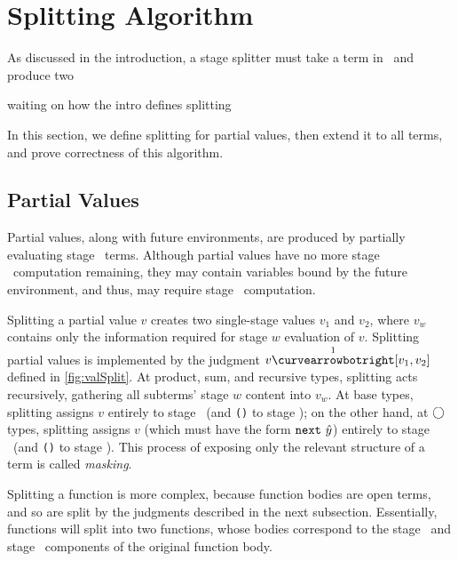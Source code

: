 
\section{Splitting Algorithm}
\label{sec:splitting}

As discussed in the introduction, a stage splitter must take a term in \lang\
and produce two 

\TODO waiting on how the intro defines splitting

In this section, we define splitting for partial values, then extend it to all
terms, and prove correctness of this algorithm.

\subsection{Partial Values}

Partial values, along with future environments, are produced by partially
evaluating stage \bbone\ terms. Although partial values have no more stage
\bbone\ computation remaining, they may contain variables bound by the future
environment, and thus, may require stage \bbtwo\ computation.

Splitting a partial value $v$ creates two single-stage values $v_1$ and $v_2$,
where $v_w$ contains only the information required for stage $w$ evaluation of
$v$. Splitting partial values is implemented by the judgment $v \vsplito
[v_1,v_2]$ defined in \ref{fig:valSplit}. 
At product, sum, and recursive types, splitting acts recursively, gathering all
subterms' stage $w$ content into $v_w$. At base types, splitting assigns $v$
entirely to stage \bbone\ (and \texttt{()} to stage \bbtwo); on the other hand,
at $\bigcirc$ types, splitting assigns $v$ (which must have the form ${\tt next}~\hat y$)
entirely to stage \bbtwo\ (and \texttt{()} to stage \bbone). This process of
exposing only the relevant structure of a term is called \emph{masking}.



Splitting a function is more complex, because function bodies are open terms,
and so are split by the judgments described in the next subsection. Essentially,
functions will split into two functions, whose bodies correspond to the stage
\bbone\ and stage \bbtwo\ components of the original function body.

